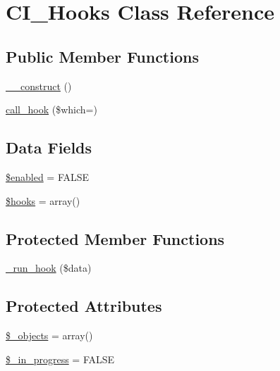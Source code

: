 \hypertarget{class_c_i___hooks}{}\section{C\+I\+\_\+\+Hooks Class Reference}
\label{class_c_i___hooks}
\subsection*{Public Member Functions}
\begin{DoxyCompactItemize}
\item 
\mbox{\hyperlink{class_c_i___hooks_a095c5d389db211932136b53f25f39685}{\+\_\+\+\_\+construct}} ()
\item 
\mbox{\hyperlink{class_c_i___hooks_a470d397aaf24f1ca3ef73021ad03492b}{call\+\_\+hook}} (\$which=\textquotesingle{}\textquotesingle{})
\end{DoxyCompactItemize}
\subsection*{Data Fields}
\begin{DoxyCompactItemize}
\item 
\mbox{\hyperlink{class_c_i___hooks_a8d376199cc641e3e7af6e1a0d5c736d9}{\$enabled}} = F\+A\+L\+SE
\item 
\mbox{\hyperlink{class_c_i___hooks_a05aec88c3516c6db5da524fbcc673aff}{\$hooks}} = array()
\end{DoxyCompactItemize}
\subsection*{Protected Member Functions}
\begin{DoxyCompactItemize}
\item 
\mbox{\hyperlink{class_c_i___hooks_a2cd07b3fcfaf153a37f164d3fbc7c3d9}{\+\_\+run\+\_\+hook}} (\$data)
\end{DoxyCompactItemize}
\subsection*{Protected Attributes}
\begin{DoxyCompactItemize}
\item 
\mbox{\hyperlink{class_c_i___hooks_a7f925b11c74f8a8aa0d4627c6f7844ce}{\$\+\_\+objects}} = array()
\item 
\mbox{\hyperlink{class_c_i___hooks_a6e8d0edcf7a4fb3e76c0f6d00e70053e}{\$\+\_\+in\+\_\+progress}} = F\+A\+L\+SE
\end{DoxyCompactItemize}


